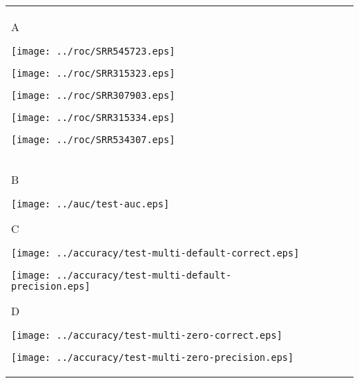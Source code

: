 \documentclass{minimal}
\renewcommand\big{\fontsize{10pt}{10pt}\selectfont}
\begin{document}
\begin{tabular}{lllll}

	\begin{minipage}[t][][t]{0.01cm} {\vspace{-2.00cm} \big\textsf{A}} \end{minipage}
	\begin{minipage}[b][][b]{2.01cm} {\centering \texttt{[image: ../roc/SRR545723.eps]}} \end{minipage} 
	\begin{minipage}[b][][b]{1.81cm} {\centering \texttt{[image: ../roc/SRR315323.eps]}} \end{minipage}
	\begin{minipage}[b][][b]{1.81cm} {\centering \texttt{[image: ../roc/SRR307903.eps]}} \end{minipage}
	\begin{minipage}[b][][b]{1.81cm} {\centering \texttt{[image: ../roc/SRR315334.eps]}} \end{minipage}
	\begin{minipage}[b][][b]{1.81cm} {\centering \texttt{[image: ../roc/SRR534307.eps]}} \end{minipage}\\

	\begin{minipage}[t][][t]{0.04cm} {\vspace{-1.7cm} \big\textsf{B}} \end{minipage}
	\begin{minipage}[b][][b]{1.23cm} {\centering \texttt{[image: ../auc/test-auc.eps]}} \end{minipage} 

	\begin{minipage}[t][][t]{0.12cm} {\vspace{-1.7cm} \big\textsf{C}} \end{minipage}
	\begin{minipage}[b][][b]{1.23cm} {\centering \texttt{[image: ../accuracy/test-multi-default-correct.eps]}} \end{minipage} 
	\begin{minipage}[b][][b]{1.23cm} {\centering \texttt{[image: ../accuracy/test-multi-default-precision.eps]}} \end{minipage}

	\begin{minipage}[t][][t]{0.12cm} {\vspace{-1.7cm} \big\textsf{D}} \end{minipage}
	\begin{minipage}[b][][b]{1.18cm} {\centering \texttt{[image: ../accuracy/test-multi-zero-correct.eps]}} \end{minipage} 
	\begin{minipage}[b][][b]{1.23cm} {\centering \texttt{[image: ../accuracy/test-multi-zero-precision.eps]}} \end{minipage}


\end{tabular}
\end{document}
